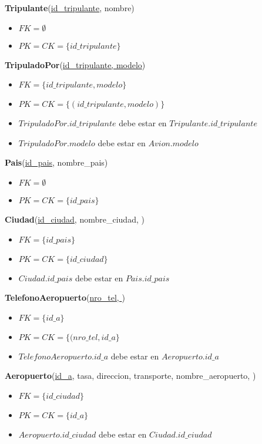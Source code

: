 \vspace*{0.1cm}
\noindent
\textbf{Tripulante}(\underline{id\_tripulante}, nombre)
\begin{itemize}[noitemsep]
	\item $FK = \emptyset$
	\item $PK = CK = \{id\_tripulante\}$
\end{itemize}

\vspace*{0.1cm}
\noindent
\textbf{TripuladoPor}(\underline{id\_tripulante, modelo})
\begin{itemize}[noitemsep]
	\item $FK = \{id\_tripulante, modelo\}$
	\item $PK = CK = \{(id\_tripulante, modelo)\}$
	\item $TripuladoPor.id\_tripulante$ debe estar en
		$Tripulante.id\_tripulante$
	\item $TripuladoPor.modelo$ debe estar en $Avion.modelo$
\end{itemize}

\vspace*{0.1cm}
\noindent
\textbf{Pais}(\underline{id\_pais}, nombre\_pais)
\begin{itemize}[noitemsep]
	\item $FK = \emptyset$
	\item $PK = CK = \{id\_pais\}$
\end{itemize}

\newpage
\noindent
\textbf{Ciudad}(\underline{id\_ciudad}, nombre\_ciudad, )
\begin{itemize}[noitemsep]
	\item $FK = \{id\_pais\}$
	\item $PK = CK = \{id\_ciudad\}$
	\item $Ciudad.id\_pais$ debe estar en $Pais.id\_pais$
\end{itemize}

\vspace*{0.1cm}
\noindent
\textbf{TelefonoAeropuerto}(\underline{nro\_tel, })
\begin{itemize}[noitemsep]
	\item $FK = \{id\_a\}$
	\item $PK = CK = \{(nro\_tel, id\_a\}$
	\item $TelefonoAeropuerto.id\_a$ debe estar en $Aeropuerto.id\_a$
\end{itemize}

\vspace*{0.1cm}
\noindent
\textbf{Aeropuerto}(\underline{id\_a}, tasa, direccion, transporte, 
			nombre\_aeropuerto, )
\begin{itemize}[noitemsep]
	\item $FK = \{id\_ciudad\}$
	\item $PK = CK = \{id\_a\}$
	\item $Aeropuerto.id\_ciudad$ debe estar en $Ciudad.id\_ciudad$
\end{itemize}

